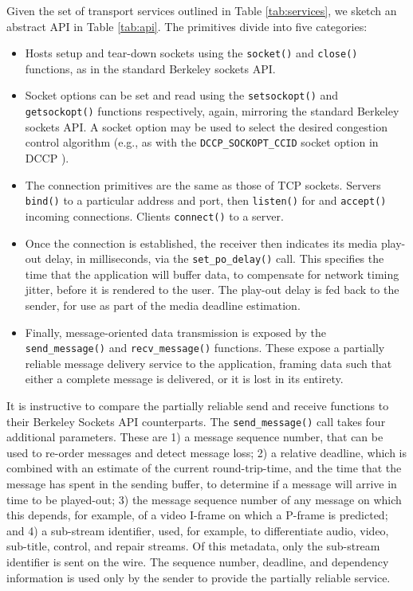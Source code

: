 \documentclass{sig-alternate-05-2015}
\begin{document}
Given the set of transport services outlined in Table \ref{tab:services},
we sketch an abstract API in  Table \ref{tab:api}. The primitives divide
into five categories:

\begin{itemize}
  \item Hosts setup and tear-down sockets using the \texttt{socket()}
    and \texttt{close()} functions, as in the standard Berkeley sockets
    API.

  \item Socket options can be set and read using the \texttt{setsockopt()}
    and \texttt{getsockopt()} functions respectively, again, mirroring the
    standard Berkeley sockets API. A socket option may be used to select
    the desired congestion control algorithm (e.g., as with the
    \texttt{DCCP\_SOCKOPT\_CCID} socket option in DCCP \cite{rfc:4340}).

  \item The connection primitives are the same as those of TCP sockets.
    Servers \texttt{bind()} to a particular address and port, then
    \texttt{listen()} for and \texttt{accept()} incoming connections.
    Clients \texttt{connect()} to a server.

   \item Once the connection is established, the receiver
     then indicates its media play-out delay, in milliseconds, via
     the \texttt{set\_po\_delay()} call. This specifies the time that the
     application will buffer data, to compensate for network timing jitter,
     before it is rendered to the user. The play-out delay is fed back to
     the sender, for use as part of the media deadline estimation.

  \item Finally, message-oriented data transmission is exposed by the
    \texttt{send\_message()} and \texttt{recv\_message()} functions.
    These expose a partially reliable message delivery service to the
    application, framing data such that either a complete message is
    delivered, or it is lost in its entirety.

\end{itemize}

    It is instructive to compare the partially reliable send and receive
    functions to their Berkeley Sockets API counterparts. The
    \texttt{send\_message()} call takes four additional parameters. These are 1)
    a message sequence number, that can be used to re-order messages and detect
    message loss; 2) a relative deadline, which is combined with an estimate of
    the current round-trip-time, and the time that the message has spent in the
    sending buffer, to determine if a message will arrive in time to be
    played-out; 3) the message sequence number of any message on which this
    depends, for example, of a video I-frame on which a P-frame is predicted;
    and 4) a sub-stream identifier, used, for example, to differentiate audio,
    video, sub-title, control, and repair streams. Of this metadata, only the
    sub-stream identifier is sent on the wire. The sequence number, deadline,
    and dependency information is used only by the sender to provide the
    partially reliable service.
\end{document}

